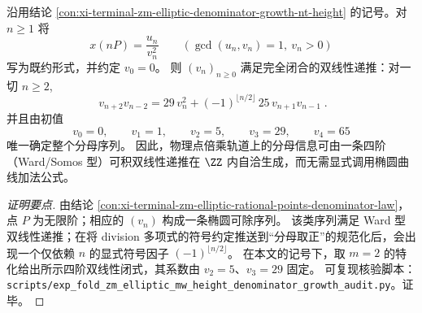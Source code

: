 \begin{conclusion}\label{con:xi-terminal-zm-elliptic-denominator-ward-bilinear-recurrence}
沿用结论 \ref{con:xi-terminal-zm-elliptic-denominator-growth-nt-height} 的记号。对 \(n\ge 1\) 将
\[
x(nP)=\frac{u_n}{v_n^2}\qquad(\gcd(u_n,v_n)=1,\ v_n>0)
\]
写为既约形式，并约定 \(v_0=0\)。
则 \((v_n)_{n\ge 0}\) 满足完全闭合的双线性递推：对一切 \(n\ge 2\),
\[
\boxed{\;
v_{n+2}v_{n-2}=29\,v_n^2+(-1)^{\lfloor n/2\rfloor}\,25\,v_{n+1}v_{n-1}\; }.
\]
并且由初值
\[
v_0=0,\qquad v_1=1,\qquad v_2=5,\qquad v_3=29,\qquad v_4=65
\]
唯一确定整个分母序列。
因此，物理点倍乘轨道上的分母信息可由一条四阶（Ward/Somos 型）可积双线性递推在 \(\ZZ\) 内自洽生成，而无需显式调用椭圆曲线加法公式。
\end{conclusion}
\begin{proof}[证明要点]
由结论 \ref{con:xi-terminal-zm-elliptic-rational-points-denominator-law}，点 \(P\) 为无限阶；相应的 \((v_n)\) 构成一条椭圆可除序列。
该类序列满足 Ward 型双线性递推；在将 division 多项式的符号约定推送到“分母取正”的规范化后，会出现一个仅依赖 \(n\) 的显式符号因子 \( (-1)^{\lfloor n/2\rfloor}\)。
在本文的记号下，取 \(m=2\) 的特化给出所示四阶双线性闭式，其系数由 \(v_2=5\)、\(v_3=29\) 固定。
可复现核验脚本：\texttt{scripts/exp\_fold\_zm\_elliptic\_mw\_height\_denominator\_growth\_audit.py}。证毕。
\end{proof}


